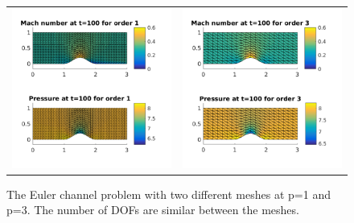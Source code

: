 \documentclass{article}
\begin{document}
\begin{figure}[!ht]
\centering
\begin{tabular}{c c}
\includegraphics[scale=0.8]{channel_obs_1.pdf} &
\includegraphics[scale=0.8]{channel_obs_3.pdf}
\end{tabular}
\caption{The Euler channel problem with two different meshes at p=1 and p=3. The number of DOFs are similar between the meshes.}
\label{fig:channel-obs}
\end{figure}
\end{document}
